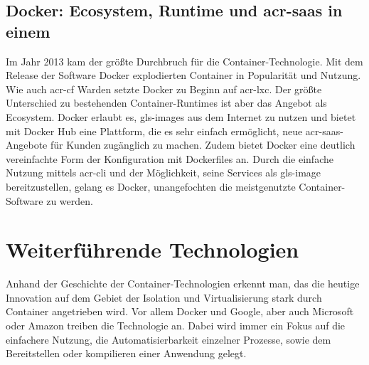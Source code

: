\subsection{Docker: Ecosystem, Runtime und \gls{acr-saas} in einem}
\label{sec:geschichteDocker}
Im Jahr 2013 kam der größte Durchbruch für die Container-Technologie. Mit dem Release der Software Docker explodierten Container in Popularität und Nutzung. Wie auch \gls{acr-cf} Warden setzte Docker zu Beginn auf \gls{acr-lxc}. Der größte Unterschied zu bestehenden Container-Runtimes ist aber das Angebot als Ecosystem. Docker erlaubt es, \glspl{gls-image} aus dem Internet zu nutzen und bietet mit Docker Hub eine Plattform, die es sehr einfach ermöglicht, neue \gls{acr-saas}-Angebote für Kunden zugänglich zu machen. Zudem bietet Docker eine deutlich vereinfachte Form der Konfiguration mit Dockerfiles an. Durch die einfache Nutzung mittels \gls{acr-cli} und der Möglichkeit, seine Services als \gls{gls-image} bereitzustellen, gelang es Docker, unangefochten die meistgenutzte Container-Software zu werden.

\section{Weiterführende Technologien}
\label{sec:timeline}
Anhand der Geschichte der Container-Technologien erkennt man, das die heutige Innovation auf dem Gebiet der Isolation und Virtualisierung stark durch Container angetrieben wird. Vor allem Docker und Google, aber auch Microsoft oder Amazon treiben die Technologie an. Dabei wird immer ein Fokus auf die einfachere Nutzung, die Automatisierbarkeit einzelner Prozesse, sowie dem Bereitstellen oder kompilieren einer Anwendung gelegt.

